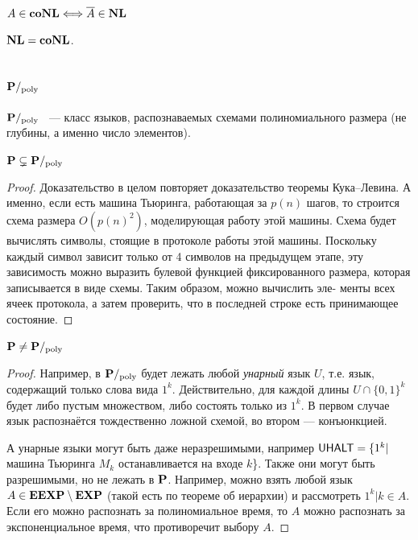 \subsection{\conlsp}

\begin{definition}
$A \in \textbf{coNL} \Longleftrightarrow \overline{A} \in \textbf{NL}$
\end{definition}

\begin{theorem}
$\textbf{NL} = \textbf{coNL}$.
\end{theorem}

\subsection{$\textbf{P}/_{\mathrm{poly}}$}

\begin{definition}
$\textbf{P}/_{\mathrm{poly}}$ ~--- класс языков, распознаваемых схемами полиномиального размера (не глубины, а именно число элементов).
\end{definition}

\begin{statement}
$\textbf{P} \subsetneq \textbf{P}/_{\mathrm{poly}}$
\end{statement}

\begin{proof}
Доказательство в целом повторяет доказательство теоремы Кука–Левина. А именно, если есть машина Тьюринга, работающая за $p(n)$ шагов, то строится схема размера $O(p(n)^2)$, моделирующая работу этой машины. Схема будет вычислять символы, стоящие в протоколе работы этой машины. Поскольку каждый символ зависит только от 4 символов на предыдущем этапе, эту зависимость можно выразить булевой функцией фиксированного размера, которая записывается в виде схемы. Таким образом, можно вычислить эле- менты всех ячеек протокола, а затем проверить, что в последней строке есть принимающее состояние.
\end{proof}

\begin{statement}
$\textbf{P} \neq \textbf{P}/_{\mathrm{poly}}$
\end{statement}

\begin{proof}
Например, в $\textbf{P}/_{\mathrm{poly}}$ будет лежать любой \textit{унарный} язык $U$, т.е. язык, содержащий только слова вида $1^k$. Действительно, для каждой длины $U \cap \{0, 1\}^k$ будет либо пустым множеством, либо состоять только из $1^k$. В первом случае язык распознаётся тождественно ложной схемой, во втором --- конъюнкцией.

А унарные языки могут быть даже неразрешимыми, например $\mathsf{UHALT} = \{1^k | $ машина Тьюринга $M_k$ останавливается на входе $k$\}. Также они могут быть разрешимыми, но не лежать в $\textbf{P}$. Например, можно взять любой язык $A \in \textbf{EEXP} \setminus \textbf{EXP}$ (такой есть по теореме об иерархии) и рассмотреть ${1^k | k \in A}$. Если его можно распознать за полиномиальное время, то $A$ можно распознать за экспоненциальное время, что противоречит выбору $A$.
\end{proof}

